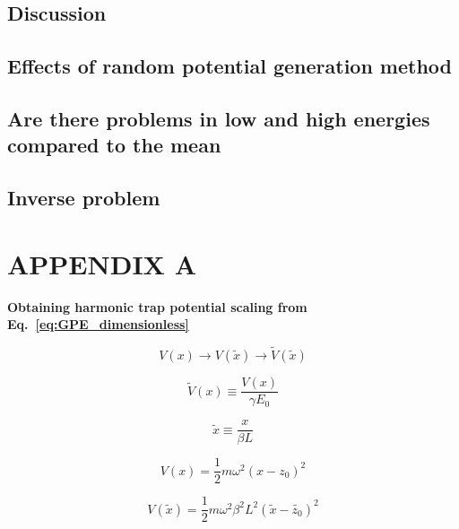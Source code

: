 \documentclass[a4paper,times,hidelinks,12pt]{article}
\begin{document}
\subsection{Discussion}
\subsection{Effects of random potential generation method}
\subsection{Are there problems in low and high energies compared to the mean}
\subsection{Inverse problem}


\clearpage

\clearpage




\appendix
\section{APPENDIX A}
\label{ap:scale}

\textbf{Obtaining harmonic trap potential scaling from Eq.~\eqref{eq:GPE_dimensionless}}

\begin{equation}
\label{eq:GPESCALE_harmonic_potential_transform}
    V(x) \rightarrow V(\widetilde{x}) \rightarrow \widetilde{V}(\widetilde{x})
\end{equation}

\begin{equation}
\label{eq:GPESCALE_dimensionless_harmonic_potential}
    \widetilde{V}(x) \equiv \frac{V(x)}{\gamma E_0}
\end{equation}

\begin{equation}
\label{eq:GPESCALE_dimensionless_length}
    \widetilde{x} \equiv \frac{x}{\beta L} 
\end{equation}

\begin{equation}
\label{eq:GPESCALE_harmonic_potential}
    V(x) = \frac{1}{2}m\omega^2 (x-z_0)^2
\end{equation}

\begin{equation}
\label{eq:GPESCALE_harmonic_length_transform}
    V(\widetilde{x}) = \frac{1}{2}m\omega^2 \beta^2 L^2 (\widetilde{x}-\widetilde{z_0})^2
\end{equation}
\end{document}
